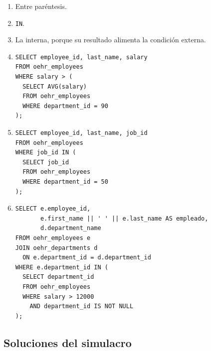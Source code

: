 \documentclass[11pt,a4paper]{article}
\newcommand{\campo}[1]{\texttt{#1}}
\begin{document}
\begin{enumerate}[label=\textbf{M7.\arabic*}]
  \item Entre paréntesis.
  \item \campo{IN}.
  \item La interna, porque su resultado alimenta la condición externa.
  \item
\begin{lstlisting}
SELECT employee_id, last_name, salary
FROM oehr_employees
WHERE salary > (
  SELECT AVG(salary)
  FROM oehr_employees
  WHERE department_id = 90
);
\end{lstlisting}
  \item
\begin{lstlisting}
SELECT employee_id, last_name, job_id
FROM oehr_employees
WHERE job_id IN (
  SELECT job_id
  FROM oehr_employees
  WHERE department_id = 50
);
\end{lstlisting}
  \item
\begin{lstlisting}
SELECT e.employee_id,
       e.first_name || ' ' || e.last_name AS empleado,
       d.department_name
FROM oehr_employees e
JOIN oehr_departments d
  ON e.department_id = d.department_id
WHERE e.department_id IN (
  SELECT department_id
  FROM oehr_employees
  WHERE salary > 12000
    AND department_id IS NOT NULL
);
\end{lstlisting}
\end{enumerate}

\subsection{Soluciones del simulacro}
\end{document}
